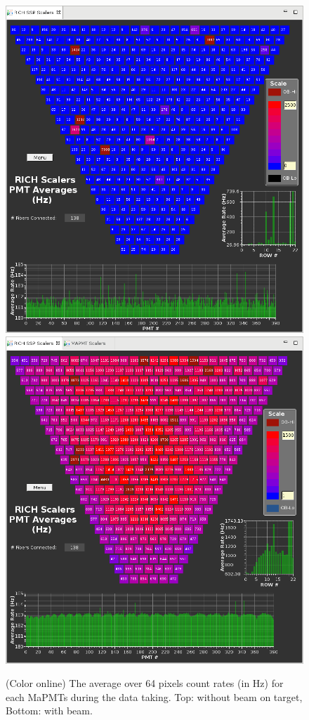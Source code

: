 \documentclass[5p,times,twocolumn]{elsarticle}
\begin{document}
\begin{figure}[t]
\begin{center}
\includegraphics[width=0.7\columnwidth]{Scalers_BeamOff.png}
\includegraphics[width=0.7\columnwidth]{Scalers_BeamOn.png}
\end{center}
\caption{(Color online) The average over 64 pixels count rates (in Hz) for each MaPMTs during the data taking. Top: without beam on target, Bottom: with beam.}
\label{fig:Online_Scalers}
\end{figure}
\end{document}
